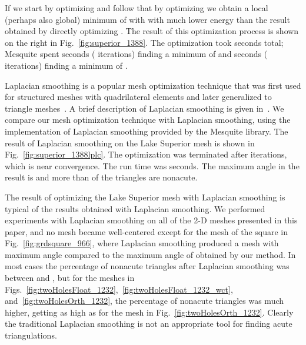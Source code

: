\documentclass[final]{siamltex}
\begin{document}
If we start by optimizing  and follow that by optimizing
 we obtain a local (perhaps also global) minimum of 
with with much lower energy than the result obtained by directly
optimizing .  The result of this optimization process is
shown on the right in Fig.~\ref{fig:superior_1388}.  The optimization
took  seconds total; Mesquite spent  seconds (
iterations) finding a minimum of  and  seconds (
iterations) finding a minimum of .


Laplacian smoothing is a popular mesh optimization technique
that was first used for structured meshes with quadrilateral
elements and later generalized to triangle meshes~\cite{Winslow1964}.
A brief description of Laplacian smoothing is given
in~\cite{Field1988}.  We compare our mesh optimization
technique with Laplacian smoothing,
using the implementation of Laplacian smoothing provided by
the Mesquite library.  The result of Laplacian smoothing
on the Lake Superior mesh is shown in
Fig.~\ref{fig:superior_1388lplc}.  The optimization was
terminated after  iterations, which is near convergence.
The run time was  seconds.  
The maximum angle in the result is \textdegree{}
and more than  of the triangles are nonacute.

The result of optimizing the Lake Superior mesh with Laplacian
smoothing is typical of the results obtained
with Laplacian smoothing.  We performed
experiments with Laplacian smoothing on all of the
2-D meshes presented in this paper, and no mesh became
well-centered except for the mesh of the square
in Fig.~\ref{fig:grdsquare_966}, where Laplacian smoothing
produced a mesh with maximum angle \textdegree{}
compared to the maximum angle of \textdegree{} obtained
by our method.  In most cases the percentage of nonacute
triangles after Laplacian smoothing was between  and
, but for the meshes in
Figs.~\ref{fig:twoHolesFloat_1232},~\ref{fig:twoHolesFloat_1232_wct},
and~\ref{fig:twoHolesOrth_1232}, the percentage of nonacute
triangles was much higher, getting as high as
 for the mesh in Fig.~\ref{fig:twoHolesOrth_1232}.
Clearly the traditional Laplacian smoothing is not an
appropriate tool for finding acute triangulations.
\end{document}
